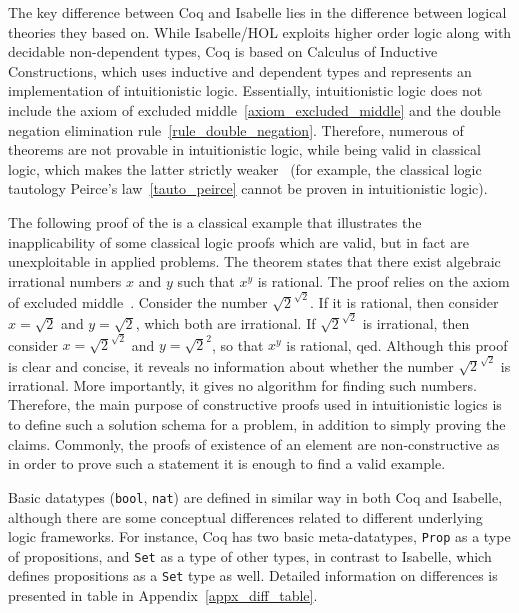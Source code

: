 \documentclass[article]{aaltoseries}
\begin{document}
The key difference between Coq and Isabelle lies in the difference between logical theories they based on. While Isabelle/HOL exploits higher order logic along with decidable non-dependent types, Coq is based on Calculus of Inductive Constructions, which uses inductive and dependent types and represents an implementation of intuitionistic logic. Essentially, intuitionistic logic does not include the axiom of excluded middle~\eqref{axiom_excluded_middle} and the double negation elimination rule~\eqref{rule_double_negation}.
Therefore, numerous of theorems are not provable in intuitionistic logic, while being valid in classical logic, which makes the latter strictly weaker~\cite{Rush14} (for example, the classical logic tautology Peirce's law~\eqref{tauto_peirce} cannot be proven in intuitionistic logic).

The following proof of the is a classical example that illustrates the inapplicability of some classical logic proofs which are valid, but in fact are unexploitable in applied problems. The theorem states that there exist algebraic irrational numbers $x$ and $y$ such that $x^y$ is rational. The proof relies on the axiom of excluded middle~\cite{Harrison09}. Consider the number $\sqrt{2}^{\sqrt{2}}$. If it is rational, then consider $x = \sqrt{2}$ and $y = \sqrt{2}$, which both are irrational. If $\sqrt{2}^{\sqrt{2}}$ is irrational, then consider $x = \sqrt{2}^{\sqrt{2}}$ and $y = \sqrt{2}^{2}$, so that $x^{y}$ is rational, qed. Although this proof is clear and concise, it reveals no information about whether the number $\sqrt{2}^{\sqrt{2}}$ is irrational. More importantly, it gives no algorithm for finding such numbers. Therefore, the main purpose of constructive proofs used in intuitionistic logics is to define such a solution schema for a problem, in addition to simply proving the claims.
Commonly, the proofs of existence of an element are non-constructive as in order to prove such a statement it is enough to find a valid example. %


Basic datatypes (\texttt{bool}, \texttt{nat}) are defined in similar way in both Coq and Isabelle, although there are some conceptual differences related to different underlying logic frameworks. For instance, Coq has two basic meta-datatypes, \texttt{Prop} as a type of propositions, and \texttt{Set} as a type of other types, in contrast to Isabelle, which defines propositions as a \texttt{Set} type as well. Detailed information on differences is presented in table in Appendix~\ref{appx_diff_table}.
\end{document}
